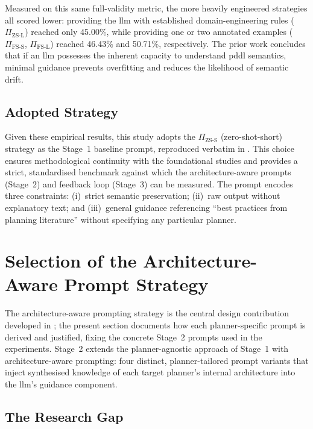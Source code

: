 \noindent Measured on this same full-validity metric, the more heavily engineered strategies all scored lower: providing the \gls{llm} with established domain-engineering rules ($\Pi_\text{ZS-L}$) reached only 45.00\%, while providing one or two annotated examples ($\Pi_\text{FS-S}$, $\Pi_\text{FS-L}$) reached 46.43\% and 50.71\%, respectively.
The prior work concludes that if an \gls{llm} possesses the inherent capacity to understand \gls{pddl} semantics, minimal guidance prevents overfitting and reduces the likelihood of semantic drift.

\subsection{Adopted Strategy}

Given these empirical results, this study adopts the $\Pi_\text{ZS-S}$ (zero-shot-short) strategy as the Stage~1 baseline prompt, reproduced verbatim in .
This choice ensures methodological continuity with the foundational studies and provides a strict, standardised benchmark against which the architecture-aware prompts (Stage~2) and feedback loop (Stage~3) can be measured.
The prompt encodes three constraints: (i)~strict semantic preservation; (ii)~raw output without explanatory text; and (iii)~general guidance referencing ``best practices from planning literature'' without specifying any particular planner.


\section{Selection of the Architecture-Aware Prompt Strategy}
\label{sec:setup:arch_aware_prompt}

The architecture-aware prompting strategy is the central design contribution developed in ; the present section documents how each planner-specific prompt is derived and justified, fixing the concrete Stage~2 prompts used in the experiments.
Stage~2 extends the planner-agnostic approach of Stage~1 with architecture-aware prompting: four distinct, planner-tailored prompt variants that inject synthesised knowledge of each target planner's internal architecture into the \gls{llm}'s guidance component.

\subsection{The Research Gap}

